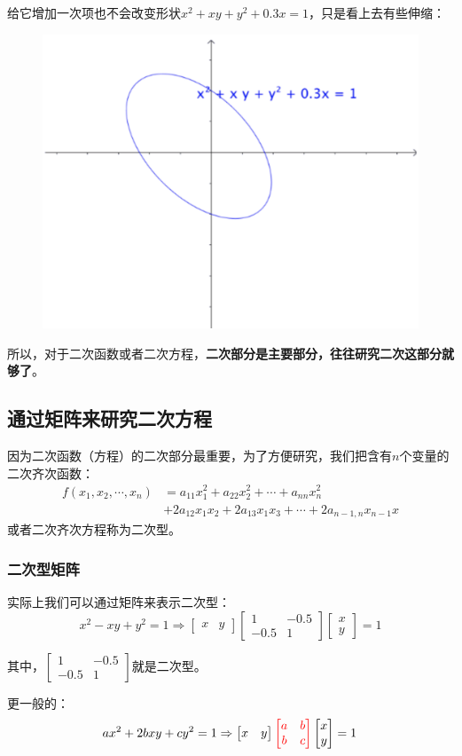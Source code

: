 \documentclass[12pt]{article}
\begin{document}
给它增加一次项也不会改变形状$x^2 + xy + y^2 + 0.3x = 1$，只是看上去有些伸缩：
\begin{figure}[H]
    \centering
    \includegraphics[width=.3\textwidth]{fig/UnderstandQuadraticForm_2.png}
\end{figure} 

所以，对于二次函数或者二次方程，\textbf{二次部分是主要部分，往往研究二次这部分就够了}。

\subsection{通过矩阵来研究二次方程}
因为二次函数（方程）的二次部分最重要，为了方便研究，我们把含有$n$个变量的二次齐次函数：
\begin{align*}
f(x_1, x_2, \cdots, x_n) &= a_{11}x_1^2 + a_{22}x_2^2 + \cdots + a_{nn}x_n^2 \\
 &+ 2a_{12}x_1x_2 + 2a_{13}x_1x_3 + \cdots + 2a_{n-1,n}x_{n-1}x
\end{align*}
或者二次齐次方程称为二次型。

\subsubsection{二次型矩阵}
实际上我们可以通过矩阵来表示二次型：
$$
x^2 - xy + y^2 = 1 \Rightarrow 
\begin{bmatrix}x & y\end{bmatrix}
\begin{bmatrix}1&-0.5\\-0.5&1\end{bmatrix}
\begin{bmatrix}x \\ y\end{bmatrix} = 1
$$

其中，$\left[\begin{smallmatrix}1&-0.5\\-0.5&1\end{smallmatrix}\right]$就是二次型。

更一般的：
$$
ax^2 + 2bxy + cy^2 = 1\Rightarrow 
\begin{bmatrix}x & y\end{bmatrix}
\textcolor{red}{\begin{bmatrix}a&b\\b&c\end{bmatrix}}
\begin{bmatrix}x \\ y\end{bmatrix} = 1
$$
\end{document}
